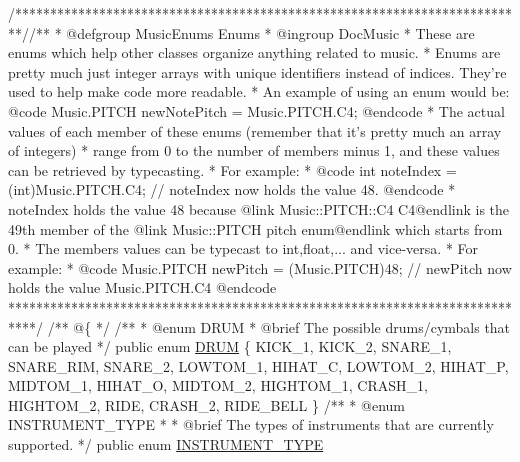 \begin{DoxyCodeInclude}
    \textcolor{comment}{/*************************************************************************/}\textcolor{comment}{/** }
\textcolor{comment}{     * @defgroup MusicEnums Enums}
\textcolor{comment}{     * @ingroup DocMusic}
\textcolor{comment}{     * These are enums which help other classes organize anything related to music.}
\textcolor{comment}{     * Enums are pretty much just integer arrays with unique identifiers instead of indices. They're used
       to help make code more readable.}
\textcolor{comment}{     * An example of using an enum would be: @code Music.PITCH newNotePitch = Music.PITCH.C4; @endcode }
\textcolor{comment}{     * The actual values of each member of these enums (remember that it's pretty much an array of
       integers)}
\textcolor{comment}{     * range from 0 to the number of members minus 1, and these values can be retrieved by typecasting.}
\textcolor{comment}{     * For example: }
\textcolor{comment}{     * @code int noteIndex = (int)Music.PITCH.C4; // noteIndex now holds the value 48. @endcode }
\textcolor{comment}{     * noteIndex holds the value 48 because @link Music::PITCH::C4 C4@endlink is the 49th member of the
       @link Music::PITCH pitch enum@endlink which starts from 0.}
\textcolor{comment}{     * The members values can be typecast to int,float,... and vice-versa.}
\textcolor{comment}{     * For example: }
\textcolor{comment}{     * @code Music.PITCH newPitch = (Music.PITCH)48; // newPitch now holds the value Music.PITCH.C4
       @endcode}
\textcolor{comment}{     ****************************************************************************/}\textcolor{comment}{}
\textcolor{comment}{    /** @\{ */}
\textcolor{comment}{}
\textcolor{comment}{    /**}
\textcolor{comment}{    * @enum DRUM}
\textcolor{comment}{    * @brief The possible drums/cymbals that can be played}
\textcolor{comment}{    */}
    \textcolor{keyword}{public} \textcolor{keyword}{enum} \hyperlink{group___music_enums_gade475b4382c7066d1af13e7c13c029b6}{DRUM}
    \{
        KICK\_1,
        KICK\_2,
        SNARE\_1,
        SNARE\_RIM,
        SNARE\_2,
        LOWTOM\_1,
        HIHAT\_C,
        LOWTOM\_2,
        HIHAT\_P,
        MIDTOM\_1,
        HIHAT\_O,
        MIDTOM\_2,
        HIGHTOM\_1,
        CRASH\_1,
        HIGHTOM\_2,
        RIDE,
        CRASH\_2,
        RIDE\_BELL
    \}
\textcolor{comment}{}
\textcolor{comment}{    /**}
\textcolor{comment}{     * @enum INSTRUMENT\_TYPE}
\textcolor{comment}{     * }
\textcolor{comment}{     * @brief The types of instruments that are currently supported.}
\textcolor{comment}{    */}
    \textcolor{keyword}{public} \textcolor{keyword}{enum} \hyperlink{group___music_enums_gabfce60192305965558a36e368ebd67c3}{INSTRUMENT\_TYPE}

\end{DoxyCodeInclude}
